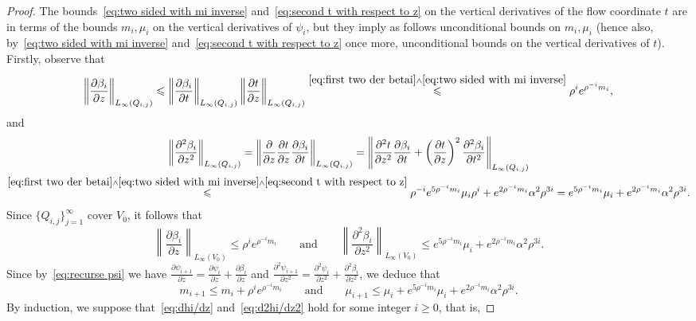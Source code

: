 \documentclass[11pt,reqno]{amsart}
\newcommand{\0}{\mathbf{0}}
\renewcommand{\1}{\mathbf 1}
\renewcommand{\ge}{\geqslant}
\renewcommand{\le}{\leqslant}
\theoremstyle{remark}
\begin{document}
\begin{proof}
 The bounds~\eqref{eq:two sided with mi inverse} and~\eqref{eq:second t with respect to z} on the vertical derivatives of the flow coordinate $t$ are in terms of the bounds $m_i,\mu_i$ on the vertical derivatives of $\psi_i$, but they imply as follows unconditional   bounds on $m_i,\mu_i$ (hence also, by~\eqref{eq:two sided with mi inverse} and~\eqref{eq:second t with respect to z} once more, unconditional bounds on the vertical derivatives of $t$). Firstly, observe that
 $$
 \left\|\frac{\partial \beta_i}{\partial z}\right\|_{L_\infty(Q_{i,j})}\le \left\|\frac{\partial \beta_i}{\partial t}\right\|_{L_\infty(Q_{i,j})}\left\|\frac{\partial t}{\partial z}\right\|_{L_\infty(Q_{i,j})}\stackrel{\eqref{eq:first two der betai}\wedge \eqref{eq:two sided with mi inverse} }{\le} \rho^ie^{\rho^{-i}m_i},
 $$
 and
\begin{multline*}
  \left\|\frac{\partial^2 \beta_i}{\partial z^2}\right\|_{L_\infty(Q_{i,j})}= \left\|\frac{\partial}{\partial z}\frac{\partial t}{\partial z}\frac{\partial \beta_i}{\partial t}\right\|_{L_\infty(Q_{i,j})}= \left\|\frac{\partial^2 t}{\partial z^2}\frac{\partial \beta_i}{\partial t}+\left(\frac{\partial t}{\partial z}\right)^2\frac{\partial^2\beta_i}{\partial t^2}\right\|_{L_\infty(Q_{i,j})}\\\stackrel{\eqref{eq:first two der betai}\wedge \eqref{eq:two sided with mi inverse}\wedge \eqref{eq:second t with respect to z} }{\le} \rho^{-i}e^{5\rho^{-i}m_i}\mu_i\rho^i+e^{2\rho^{-i}m_i}\alpha^2\rho^{3i}=e^{5\rho^{-i}m_i}\mu_i+e^{2\rho^{-i}m_i}\alpha^2\rho^{3i}.
 \end{multline*}
 Since $\{Q_{i,j}\}_{j=1}^\infty$ cover $V_0$, it follows that
 $$
  \left\|\frac{\partial \beta_i}{\partial z}\right\|_{L_\infty(V_0)}\le  \rho^ie^{\rho^{-i}m_i}\qquad\mathrm{and} \qquad   \left\|\frac{\partial^2 \beta_i}{\partial z^2}\right\|_{L_\infty(V_0)}\le e^{5\rho^{-i}m_i}\mu_i+e^{2\rho^{-i}m_i}\alpha^2\rho^{3i}.
 $$
 Since by~\eqref{eq:recurse psi} we have $\frac{\partial\psi_{i+1}}{\partial z}=\frac{\partial\psi_{i}}{\partial z}+\frac{\partial\beta_{i}}{\partial z}$ and $\frac{\partial^2\psi_{i+1}}{\partial z^2}=\frac{\partial^2\psi_{i}}{\partial z^2}+\frac{\partial^2\beta_{i}}{\partial z^2}$, we deduce that
\begin{equation}\label{m mu recursions}
 m_{i+1}\le m_i+ \rho^ie^{\rho^{-i}m_i}\qquad\mathrm{and}\qquad \mu_{i+1}\le \mu_i+ e^{5\rho^{-i}m_i}\mu_i+e^{2\rho^{-i}m_i}\alpha^2\rho^{3i}.
 \end{equation}
 By induction, we suppose that~\eqref{eq:dhi/dz} and~\eqref{eq:d2hi/dz2} hold for some integer $i\ge 0$, that is,

\end{proof}
\end{document}

